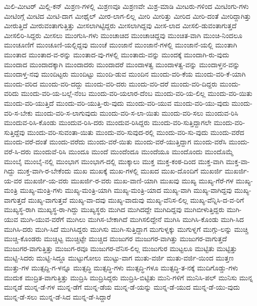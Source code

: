 {ಮಿಲಿ-ಮೀಟರ್
ಮಿಲ್ಲಿ-ಕನ್
ಮಿಶ್ರಣ-ಗಳಲ್ಲಿ
ಮಿಶ್ರಣವೂ
ಮಿಶ್ರಣವೇ
ಮಿಶ್ರ-ಮಾಡಿ
ಮೀಟರು-ಗಳಿಂದ
ಮೀಟಿಂಗು-ಗಳು
ಮೀಟಿಂಗ್ಗೆ
ಮೀಟಿದ
ಮೀಟಿ-ದಾಗ
ಮೀಥೈಲ್
ಮೀರ-ಲಾಗ-ಲಿಲ್ಲ
ಮೀರಿ
ಮೀರಿತ್ತು
ಮೀರಿದ
ಮೀರಿ-ದಂತೆ
ಮೀರಿದ್ದಾಗಿತ್ತು
ಮೀರುತ್ತಿದೆ
ಮೀರುವಂತಾಗುತ್ತಿತ್ತು
ಮೀಸಲಾಗಿಟ್ಟಿದ್ದರು
ಮೀಸಲಾಗಿದ್ದವು
ಮೀಸ-ಲಾದ
ಮೀಸಲಿ-ಡುವಂತಾಗುತ್ತದೆ
ಮೀಸಲಿರಿ-ಸಿದ್ದರು
ಮೀಸಲು
ಮುಂಗುಸಿ-ಗಳು
ಮುಂಚಾಚಿದ
ಮುಂಚಾಚಿದ್ದವು
ಮುಂಚಿತ-ವಾಗಿ
ಮುಂಚಿ-ನಿಂದಲೂ
ಮುಂಚೂಣಿಗೆ
ಮುಂಚೂಣಿ-ಯಲ್ಲಿದ್ದವು
ಮುಂಚೆ
ಮುಂಜಾನೆ
ಮುಂಜಾನೆ-ಗಳಲ್ಲಿ
ಮುಂಜಾನೆ-ಯಲ್ಲಿ
ಮುಂತಾಗಿ
ಮುಂತಾದ
ಮುಂತಾದ-ವ-ರನ್ನು
ಮುಂತಾದ-ವು-ಗಳಲ್ಲಿ
ಮುಂತಾದು-ವನ್ನು
ಮುಂದಕ್ಕೆ
ಮುಂದಾಗಿ-ರು-ವುದು
ಮುಂದಾದ
ಮುಂದಾದಕ್ಕಾಗಿ
ಮುಂದಾದರು
ಮುಂದಾದರೆ
ಮುಂದಾಳತ್ವ
ಮುಂದಾಳತ್ವ-ವನ್ನು
ಮುಂದಾಳ್ತನ-ವನ್ನು
ಮುಂದಾಳ್ತ-ನವು
ಮುಂದಿಟ್ಟರು
ಮುಂದಿಟ್ಟು
ಮುಂದಿ-ಡುವ
ಮುಂದಿನ
ಮುಂದು-ವರಿ-ಕೆಯ
ಮುಂದು-ವರಿ-ಕೆ-ಯಾಗಿ
ಮುಂದು-ವರಿದ
ಮುಂದು-ವರಿ-ದದ್ದು
ಮುಂದು-ವರಿ-ದರು
ಮುಂದು-ವರಿ-ದರೆ
ಮುಂದು-ವರಿ-ದಿದ್ದರು
ಮುಂದು-ವರಿದು
ಮುಂದು-ವರಿ-ಯ-ಬಲ್ಲೆ-ನೆಂಬ
ಮುಂದು-ವರಿ-ಯಲಾರ-ದೆಂಬ
ಮುಂದು-ವರಿ-ಯ-ಲಿಲ್ಲ
ಮುಂದು-ವರಿ-ಯಿತು
ಮುಂದು-ವರಿ-ಯುತ್ತಿದೆ
ಮುಂದು-ವರಿ-ಯುತ್ತಿ-ರು-ವುದು
ಮುಂದು-ವರಿ-ಯುವ
ಮುಂದು-ವರಿ-ಯು-ವುದು
ಮುಂದು-ವರಿ-ಸ-ಬೇಕು
ಮುಂದು-ವರಿ-ಸ-ಲಾಗುವುದು
ಮುಂದು-ವರಿ-ಸ-ಲಾ-ಯಿತು
ಮುಂದು-ವರಿ-ಸಲು
ಮುಂದುವ-ರಿಸಿ
ಮುಂದುವ-ರಿಸಿ-ಕೊಂಡು
ಮುಂದುವ-ರಿಸಿ-ದರು
ಮುಂದುವ-ರಿಸಿದ್ದರು
ಮುಂದು-ವರಿ-ಸುತ್ತಿದ್ದಾಗಲೇ
ಮುಂದು-ವರಿ-ಸುತ್ತಿದ್ದೆವು
ಮುಂದು-ವರಿ-ಸುವಂತಾ-ಯಿತು
ಮುಂದು-ವರಿ-ಸುವುದ-ರಲ್ಲಿ
ಮುಂದು-ವರಿ-ಸು-ವುದು
ಮುಂದು-ವರೆದ
ಮುಂದು-ವರೆ-ದಂತೆ
ಮುಂದು-ವರೆದು
ಮುಂದು-ವರೆ-ಯಿತು
ಮುಂದು-ವರೆ-ಯುತ್ತಿದ್ದಾಗ
ಮುಂದು-ವರೆಸಿ
ಮುಂದು-ವರೆ-ಸಿ-ದರು
ಮುಂದುವೆ-ರಿಸಿ
ಮುಂದೂ
ಮುಂದೆ
ಮುಂದೆಂದೂ
ಮುಂದೆಯೂ
ಮುಂದೊಂದು
ಮುಂದೊಮ್ಮೆ
ಮುಂಬೈ
ಮುಂಬೈ-ನಲ್ಲಿ
ಮುಂಭಾಗ
ಮುಂಭಾಗ-ದಲ್ಲಿ
ಮುಕ್ಕಾಲು
ಮುಕ್ತ
ಮುಕ್ತ-ಕಂಠ-ದಿಂದ
ಮುಕ್ತ-ವಾಗಿ
ಮುಕ್ತ-ವಾ-ಗಿದ್ದು
ಮುಕ್ತ-ವಾಗಿ-ರ-ಬೇಕೆಂದು
ಮುಖ
ಮುಖಕ್ಕೆ
ಮುಖ-ಗಳಲ್ಲಿ
ಮುಖದ
ಮುಖ-ದೊಂದಿಗೆ
ಮುಖರ್ಜಿ
ಮುಖರ್ಜಿ-ಯ-ವರ
ಮುಖರ್ಜಿ-ಯ-ವರು
ಮುಖರ್ಜಿ-ರ-ವರು
ಮುಖ-ವಾಣಿ-ಯಾಗಿ
ಮುಖವು
ಮುಖ್ಯ
ಮುಖ್ಯ-ಗೆರೆ-ಗಳ
ಮುಖ್ಯ-ಮಂತ್ರಿ
ಮುಖ್ಯ-ಮಂತ್ರಿ-ಗಳು
ಮುಖ್ಯ-ಮಂತ್ರಿ-ಯಾಗಿ
ಮುಖ್ಯ-ಮಂತ್ರಿ-ಯಾದ
ಮುಖ್ಯ-ವಾಗಿ
ಮುಖ್ಯ-ವಾಗಿದ್ದವು
ಮುಖ್ಯ-ವಾಗುತ್ತದೆ
ಮುಖ್ಯ-ವಾಗುತ್ತವೆ
ಮುಖ್ಯ-ವಾ-ದವು
ಮುಖ್ಯ-ವಾದುವು
ಮುಖ್ಯ-ವೆನಿಸ-ಲಿಲ್ಲ
ಮುಖ್ಯ-ವೆನ್ನಿಸಿ-ದ-ವ-ರಿಗೆ
ಮುಖ್ಯಸ್ಥ-ರಾಗಿ
ಮುಖ್ಯಸ್ಥ-ರಾ-ಗಿದ್ದು
ಮುಖ್ಯಸ್ಥರು
ಮುಗಿದ
ಮುಗಿದದ್ದೇ
ಮುಗಿದಿದ್ದವು
ಮುಗಿಬೀಳುತ್ತಿದ್ದರು
ಮುಗಿ-ಯುವ
ಮುಗಿ-ಯುವ-ವರೆಗೆ
ಮುಗಿಲು
ಮುಗಿಸ-ಬೇಕಾಗಿದೆ
ಮುಗಿಸಲಿದ್ದೇನೆ
ಮುಗಿಸಿ
ಮುಗಿಸಿ-ಕೊಂಡು
ಮುಗಿ-ಸಿದ
ಮುಗಿಸಿ-ದರು
ಮುಗಿ-ಸಿದೆ
ಮುಗಿಸಿದ್ದರು
ಮುಗಿಸು
ಮುಗಿ-ಸುತ್ತಿದ್ದಾಗ
ಮುಗುಳ್ನಕ್ಕು
ಮುಗುಳ್ನಗೆ
ಮುಗ್ಗು-ಲನ್ನು
ಮುಚ್ಚಿ
ಮುಚ್ಚಿ-ಕೊಂಡರು
ಮುಚ್ಚಿಟ್ಟ
ಮುಚ್ಚಿಟ್ಟೇ
ಮುಚ್ಚಿದ
ಮುಜುಗರ
ಮುಜುಗರ-ವಾಗಿತ್ತು
ಮುಜುಗರ-ವಾಗುತ್ತದೆ
ಮುಜುಗರ-ವಾಗುತ್ತಿತ್ತು
ಮುಜುಗ-ರವೂ
ಮುಜುಗರ-ವೆನಿಸ-ಲಿಲ್ಲ
ಮುಜುಗುರ
ಮುಟ್ಟಲೂ
ಮುಟ್ಟಿತು
ಮುಟ್ಟಿತ್ತು
ಮುಟ್ಟಿ-ಸಿದರು
ಮುಟ್ಟಿ-ಸಿದ್ದೂ
ಮುಟ್ಟುಗೋಲು
ಮುಟ್ಟು-ವಾಗ
ಮುತು-ವರ್ಜಿ
ಮುತು-ವರ್ಜಿ-ಯಿಂದ
ಮುತ್ತಣ
ಮುತ್ತು-ಗಳ
ಮುತ್ಸದ್ದಿ-ಗ-ಳನ್ನೂ
ಮುತ್ಸದ್ಧಿ
ಮುತ್ಸದ್ಧಿ-ಗಳು
ಮುತ್ಸದ್ಧಿ-ಗಳೂ
ಮುತ್ಸದ್ಧಿ-ತ-ನಕ್ಕೆ
ಮುದಿಗೊಡ್ಡು-ಗಳು
ಮುದುಕ
ಮುದ್ರಿತ-ವಾಗುತ್ತಿತ್ತು
ಮುದ್ರಿಸಿ
ಮುದ್ರಿಸಿದ್ದರು
ಮುದ್ರಿಸಿ-ಬಿಟ್ಟಿತು
ಮುನಿ-ಗಳಿಗೆ
ಮುನಿಸಿ-ಪಲ್
ಮುನಿಸು
ಮುನ್ನ
ಮುನ್ನಡೆ
ಮುನ್ನ-ಡೆ-ಗಳ
ಮುನ್ನ-ಡೆಗೆ
ಮುನ್ನ-ಡೆಯ
ಮುನ್ನ-ಡೆ-ಯನ್ನು
ಮುನ್ನ-ಡೆ-ಯುದ
ಮುನ್ನ-ಡೆ-ಯು-ವುದು
ಮುನ್ನ-ಡೆ-ಸಲು
ಮುನ್ನ-ಡೆ-ಸಿದ
ಮುನ್ನ-ಡೆ-ಸಿದ್ದಾರೆ
}
